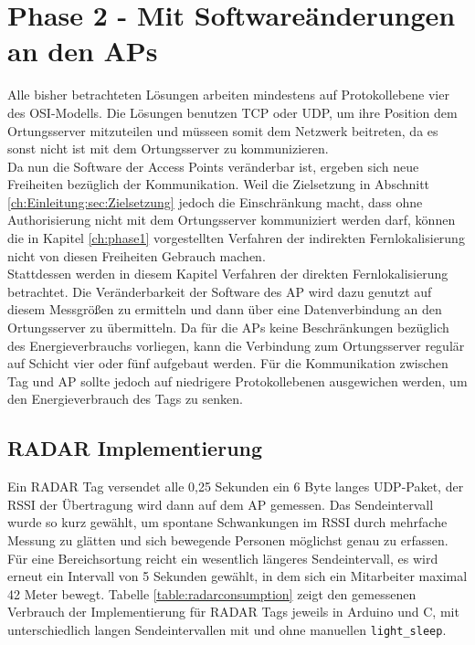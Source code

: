 \chapter{Phase 2 - Mit Softwareänderungen an den APs}
\label{ch:phase2}
Alle bisher betrachteten Lösungen arbeiten mindestens auf Protokollebene vier des OSI-Modells.
Die Lösungen benutzen TCP oder UDP, um ihre Position dem Ortungsserver mitzuteilen und müsseen somit dem Netzwerk beitreten, da es sonst nicht ist mit dem Ortungsserver zu kommunizieren.\\
Da nun die Software der Access Points veränderbar ist, ergeben sich neue Freiheiten bezüglich der Kommunikation.
Weil die Zielsetzung in Abschnitt \ref{ch:Einleitung:sec:Zielsetzung} jedoch die Einschränkung macht, dass ohne Authorisierung nicht mit dem Ortungsserver kommuniziert werden darf, können die in Kapitel \ref{ch:phase1} vorgestellten Verfahren der indirekten Fernlokalisierung nicht von diesen Freiheiten Gebrauch machen.\\
Stattdessen werden in diesem Kapitel Verfahren der direkten Fernlokalisierung betrachtet.
Die Veränderbarkeit der Software des AP wird dazu genutzt auf diesem Messgrößen zu ermitteln und dann über eine Datenverbindung an den Ortungsserver zu übermitteln.
Da für die APs keine Beschränkungen bezüglich des Energieverbrauchs vorliegen, kann die Verbindung zum Ortungsserver regulär auf Schicht vier oder fünf aufgebaut werden.
Für die Kommunikation zwischen Tag und AP sollte jedoch auf niedrigere Protokollebenen ausgewichen werden, um den Energieverbrauch des Tags zu senken. \\


\section{RADAR Implementierung}
Ein RADAR Tag versendet alle 0,25 Sekunden ein 6 Byte langes UDP-Paket, der RSSI der Übertragung wird dann auf dem AP gemessen.
Das Sendeintervall wurde so kurz gewählt, um spontane Schwankungen im RSSI durch mehrfache Messung zu glätten und sich bewegende Personen möglichst genau zu erfassen.
Für eine Bereichsortung reicht ein wesentlich längeres Sendeintervall, es wird erneut ein Intervall von 5 Sekunden gewählt, in dem sich ein Mitarbeiter maximal 42 Meter bewegt. 
Tabelle \ref{table:radarconsumption} zeigt den gemessenen Verbrauch der Implementierung für RADAR Tags jeweils in Arduino und C, mit unterschiedlich langen Sendeintervallen mit und ohne manuellen \texttt{light\_sleep}.

